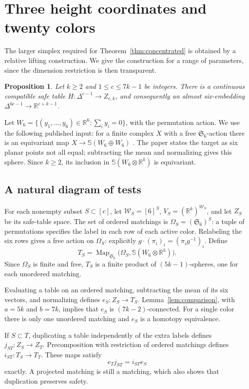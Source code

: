 \documentclass[a4paper,11pt,reqno]{amsart}
\newcommand{\R}{\mathbb R}
\newcommand{\Sym}{\mathfrak S}
\newcommand{\sphere}{\mathbb S}
\newtheorem{proposition}[theorem]{Proposition}
\theoremstyle{definition}
\theoremstyle{remark}
\numberwithin{equation}{section}
\begin{document}
\section{Three height coordinates and twenty colors}\label{sec:vector}

The larger simplex required for Theorem~\ref{thm:concentrated} is obtained by a
relative lifting construction. We give the construction for a range
of parameters, since the dimension restriction is then transparent.

\begin{proposition}\label{prop:vector}
Let $k\ge2$ and $1\le c\le7k-1$ be integers. There is a continuous
compatible safe table $H:\Delta^{c-1}\to Z_{c,k}$, and consequently
an almost six-embedding $\Delta^{6c-1}\to\R^{c+k-1}$.
\end{proposition}

Let $W_6=\{(y_1,\ldots,y_6)\in\R^6:\sum_i y_i=0\}$, with the
permutation action. We use the following published input:
for a finite complex $X$ with a free $\Sym_6$-action there is an
equivariant map $X\to\sphere(W_6\oplus W_6)$
\cite[Theorem 2.2]{AKS}. The paper states the target as six planar
points not all equal; subtracting the mean and normalizing gives this
sphere. Since $k\ge2$, its inclusion in
$\sphere(W_6\otimes\R^k)$ is equivariant.

\subsection{A natural diagram of tests}
For each nonempty subset $S\subset[c]$, let
$\mathcal W_S=[6]^S$, $V_S=(\R^k)^{\mathcal W_S}$, and let $Z_S$ be
its safe-table space. The set of ordered matchings is
$\Omega_S=(\Sym_6)^S$: a tuple of permutations specifies the label
in each row of each active color. Relabeling the six rows gives a
free action on $\Omega_S$: explicitly $g\cdot(\pi_i)_i=(\pi_i g^{-1})_i$. Define
\[
 T_S=\operatorname{Map}_{\Sym_6}
       \bigl(\Omega_S,\sphere(W_6\otimes\R^k)\bigr).
\]
Since $\Omega_S$ is finite and free, $T_S$ is a finite product of
$(5k-1)$-spheres, one for each unordered matching.

Evaluating a table on an ordered matching, subtracting the mean of
its six vectors, and normalizing defines $e_S:Z_S\to T_S$.
Lemma~\ref{lem:comparison}, with $a=5k$ and $b=7k$, implies that
$e_S$ is $(7k-2)$-connected. For a single color there is only one
unordered matching and $e_S$ is a homotopy equivalence.

If $S\subset T$, duplicating a table independently of the extra labels
defines $j_{ST}:Z_S\to Z_T$. Precomposition with restriction of
ordered matchings defines $i_{ST}:T_S\to T_T$. These maps satisfy
\begin{equation}\label{eq:naturality}
                       e_Tj_{ST}=i_{ST}e_S
\end{equation}
exactly. A projected matching is still a matching, which also shows
that duplication preserves safety.
\end{document}
